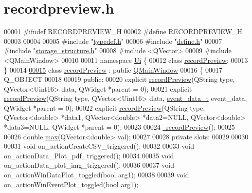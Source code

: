 \hypertarget{a00043_source}{\section{recordpreview.\+h}
\label{a00043_source}
}

\begin{DoxyCode}
00001 \textcolor{preprocessor}{#ifndef RECORDPREVIEW\_H}
00002 \textcolor{preprocessor}{#define RECORDPREVIEW\_H}
00003 
00004 
00005 \textcolor{preprocessor}{#include "\hyperlink{a00001}{typedef.h}"}
00006 \textcolor{preprocessor}{#include "\hyperlink{a00034}{define.h}"}
00007 \textcolor{preprocessor}{#include "\hyperlink{a00003}{storage\_structure.h}"}
00008 \textcolor{preprocessor}{#include <QVector>}
00009 \textcolor{preprocessor}{#include <QMainWindow>}
00010 
00011 \textcolor{keyword}{namespace }\hyperlink{a00055}{Ui} \{
00012 \textcolor{keyword}{class }\hyperlink{a00020}{recordPreview};
00013 \}
00014 
\hypertarget{a00043_source_l00015}{}\hyperlink{a00020}{00015} \textcolor{keyword}{class }\hyperlink{a00020}{recordPreview} : \textcolor{keyword}{public} \hyperlink{a00010}{QMainWindow}
00016 \{
00017     Q\_OBJECT
00018     
00019 \textcolor{keyword}{public}:
00020     \textcolor{keyword}{explicit} \hyperlink{a00020_a03ad4ae83a5594f6dc337c7b71873edd}{recordPreview}(QString type, QVector<Uint16> data, QWidget *parent = 0);
00021     \textcolor{keyword}{explicit} \hyperlink{a00020_a03ad4ae83a5594f6dc337c7b71873edd}{recordPreview}(QString type, QVector<Uint16> data, 
      \hyperlink{a00003_d0/d89/a00071}{event\_data\_t} event\_data, QWidget *parent = 0);
00022     \textcolor{keyword}{explicit} \hyperlink{a00020_a03ad4ae83a5594f6dc337c7b71873edd}{recordPreview}(QString type, QVector<double> *data1, QVector<double> *data2=NULL, 
      QVector<double> *data3=NULL, QWidget *parent = 0);
00023 
00024     \hyperlink{a00020_ab04c69b9693e7a59a08a5faa6742b71f}{~recordPreview}();
00025 
00026     \textcolor{keywordtype}{double} \hyperlink{a00020_ad38222699419e6ac871ce2a23c6d292e}{max}(QVector<double> val);
00027 
00028 \textcolor{keyword}{private} slots:
00029 
00030 
00031     \textcolor{keywordtype}{void} on\_actionCreateCSV\_triggered();
00032 
00033     \textcolor{keywordtype}{void} on\_actionData\_Plot\_pdf\_triggered();
00034 
00035     \textcolor{keywordtype}{void} on\_actionData\_plot\_img\_triggered();
00036 
00037     \textcolor{keywordtype}{void} on\_actionWinDataPlot\_toggled(\textcolor{keywordtype}{bool} arg1);
00038 
00039     \textcolor{keywordtype}{void} on\_actionWinEventPlot\_toggled(\textcolor{keywordtype}{bool} arg1);

\end{DoxyCode}
